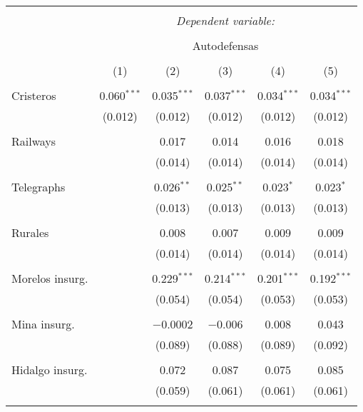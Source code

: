 
\begin{table}[!htbp] \centering 
  \caption{} 
  \label{} 
\begin{tabular}{@{\extracolsep{5pt}}lccccc} 
\\[-1.8ex]\hline 
\hline \\[-1.8ex] 
 & \multicolumn{5}{c}{\textit{Dependent variable:}} \\ 
\cline{2-6} 
\\[-1.8ex] & \multicolumn{5}{c}{Autodefensas} \\ 
\\[-1.8ex] & (1) & (2) & (3) & (4) & (5)\\ 
\hline \\[-1.8ex] 
 Cristeros & 0.060$^{***}$ & 0.035$^{***}$ & 0.037$^{***}$ & 0.034$^{***}$ & 0.034$^{***}$ \\ 
  & (0.012) & (0.012) & (0.012) & (0.012) & (0.012) \\ 
  & & & & & \\ 
 Railways &  & 0.017 & 0.014 & 0.016 & 0.018 \\ 
  &  & (0.014) & (0.014) & (0.014) & (0.014) \\ 
  & & & & & \\ 
 Telegraphs &  & 0.026$^{**}$ & 0.025$^{**}$ & 0.023$^{*}$ & 0.023$^{*}$ \\ 
  &  & (0.013) & (0.013) & (0.013) & (0.013) \\ 
  & & & & & \\ 
 Rurales &  & 0.008 & 0.007 & 0.009 & 0.009 \\ 
  &  & (0.014) & (0.014) & (0.014) & (0.014) \\ 
  & & & & & \\ 
 Morelos insurg. &  & 0.229$^{***}$ & 0.214$^{***}$ & 0.201$^{***}$ & 0.192$^{***}$ \\ 
  &  & (0.054) & (0.054) & (0.053) & (0.053) \\ 
  & & & & & \\ 
 Mina insurg. &  & $-$0.0002 & $-$0.006 & 0.008 & 0.043 \\ 
  &  & (0.089) & (0.088) & (0.089) & (0.092) \\ 
  & & & & & \\ 
 Hidalgo insurg. &  & 0.072 & 0.087 & 0.075 & 0.085 \\ 
  &  & (0.059) & (0.061) & (0.061) & (0.061) \\ 
  & & & & & \\ 

\end{tabular}
\end{table}
